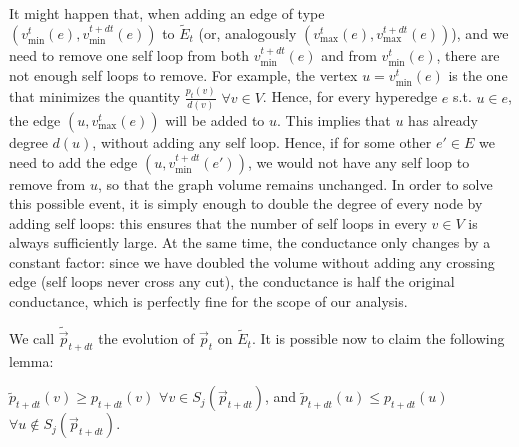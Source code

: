 \documentclass[../main.tex]{subfiles}
\begin{document}
\begin{observation}
    It might happen that, when adding an edge of type \\ $(v_{\text{min}}^t(e), v_{\text{min}}^{t+dt}(e))$ to $\tilde{E}_t$ (or, analogously $(v_{\text{max}}^t(e), v_{\text{max}}^{t+dt}(e))$), and we need to remove one self loop from both $v_{\text{min}}^{t+dt}(e)$ and from $v_{\text{min}}^{t}(e)$, there are not enough self loops to remove. For example, the vertex $u = v_{\text{min}}^t(e)$ is the one that minimizes the quantity $\frac{p_t(v)}{d(v)}$ $\forall v\in V$. Hence, for every hyperedge $e$ s.t. $u \in e$, the edge $(u, v_{\text{max}}^t(e))$ will be added to $u$. This implies that $u$ has already degree $d(u)$, without adding any self loop. Hence, if for some other $e' \in E$ we need to add the edge $(u, v_{\text{min}}^{t+dt}(e'))$, we would not have any self loop to remove from $u$, so that the graph volume remains unchanged. In order to solve this possible event, it is simply enough to double the degree of every node by adding self loops: this ensures that the number of self loops in every $v\in V$ is always sufficiently large. At the same time, the conductance only changes by a constant factor: since we have doubled the volume without adding any crossing edge (self loops never cross any cut), the conductance is half the original conductance, which is perfectly fine for the scope of our analysis.
\end{observation}

We call $\tilde{\vec{p}}_{t+dt}$ the evolution of $\vec{p}_t$ on $\tilde{E}_t$. It is possible now to claim the following lemma:

\begin{lemma}
\label{lemma:probability_more_concentrated_in_cut}
    $\tilde{p}_{t+dt}(v) \geq p_{t+dt}(v)$ $\forall v\in S_j(\vec{p}_{t+dt})$, and $\tilde{p}_{t+dt}(u) \leq p_{t+dt}(u)$ $\forall u \notin S_j(\vec{p}_{t+dt})$.
\end{lemma}
\end{document}
